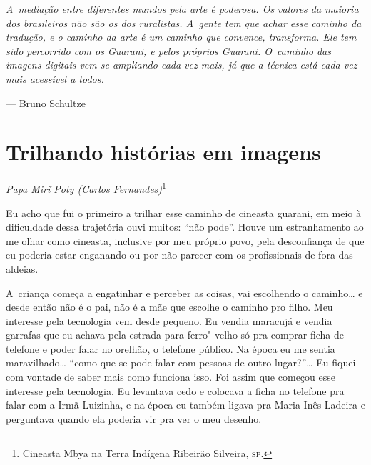 \clearpage

\vspace*{\fill}

\begin{flushright}
\begin{minipage}[c]{0.85\textwidth}
\raggedleft
\footnotesize
\emph{A~mediação entre diferentes mundos pela arte é poderosa. Os valores da
maioria dos brasileiros não são os dos ruralistas. A~gente tem que
achar esse caminho da tradução, e o caminho da arte é um caminho que
convence, transforma. Ele tem sido percorrido com os Guarani, e pelos
próprios Guarani. O~caminho das imagens digitais vem se ampliando cada
vez mais, já que a técnica está cada vez mais acessível a todos.}

\smallskip
\hspace*{\fill}--- Bruno Schultze
\end{minipage}
\end{flushright}

\thispagestyle{empty}

\chapter*{Trilhando histórias em imagens}


\begin{flushright}
\emph{Papa Mirĩ Poty (Carlos Fernandes)}\footnote{Cineasta Mbya
na Terra Indígena Ribeirão Silveira, \textsc{sp}.}
\end{flushright}
\medskip

\noindent Eu acho que fui o primeiro a trilhar esse caminho de cineasta guarani,
em meio à dificuldade dessa trajetória ouvi muitos: ``não pode''. Houve
um estranhamento ao me olhar como cineasta, inclusive por meu próprio
povo, pela desconfiança de que eu poderia estar enganando ou por não
parecer com os profissionais de fora das aldeias.

A~criança começa a engatinhar e perceber as coisas, vai escolhendo o
caminho\ldots{} e desde então não é o pai, não é a mãe que escolhe o caminho
pro filho. Meu interesse pela tecnologia vem desde pequeno. Eu vendia
maracujá e vendia garrafas que eu achava pela estrada para ferro"-velho
só pra comprar ficha de telefone e poder falar no orelhão, o telefone
público. Na época eu me sentia maravilhado\ldots{} ``como que se pode falar
com pessoas de outro lugar?''\ldots{} Eu fiquei com vontade de saber mais
como funciona isso. Foi assim que começou esse interesse pela
tecnologia. Eu levantava cedo e colocava a ficha no telefone pra falar
com a Irmã Luizinha, e na época eu também ligava pra Maria Inês Ladeira
e perguntava quando ela poderia vir pra ver o meu desenho. 

